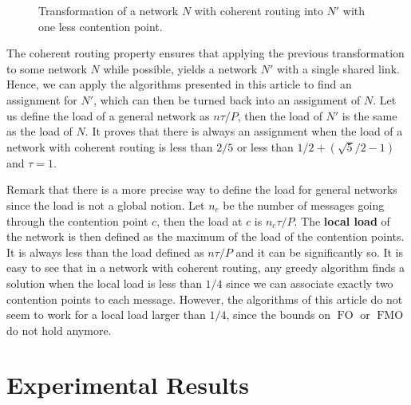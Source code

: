 \documentclass[a4paper,UKenglish,cleveref, autoref, thm-restate]{lipics-v2019}
\DeclareMathOperator{\Fo}{FO}
\DeclareMathOperator{\Fmo}{FMO}
\begin{document}
\begin{figure}
\begin{center}
\begin{minipage}[c]{.45\linewidth}
{
}



\end{minipage}
 \caption{Transformation of a network $N$ with coherent routing into $N'$ with one less contention point.}

\label{fig:transformation}
\end{center}
\end{figure}


The coherent routing property ensures that applying the previous transformation to some network $N$ while possible, yields a network $N'$ with a single shared link. Hence, we can apply the algorithms presented in this article to find an assignment for $N'$, which can then be turned back into an assignment of $N$. Let us define the load of a general network as $n\tau /P$, then the load of $N'$ is the same as the load of $N$. It proves that there is always an assignment when the load of a network with coherent routing is less than $2/5$ or less than $1/2 + (\sqrt{5}/2 -1)$ and $\tau = 1$. 

Remark that there is a more precise way to define the load for general networks since the load is not a global notion. 
Let $n_c$ be the number of messages going through the contention point $c$, then the load at $c$ is $n_c\tau/P$. The \textbf{local load} of the network is then defined as the maximum
of the load of the contention points. It is always less than the load defined as $n\tau /P$ and it can be significantly so.
It is easy to see that in a network with coherent routing, any greedy algorithm finds a solution when the local load is less than $1/4$ since we can associate 
exactly two contention points to each message. However, the algorithms of this article do not seem to work for a local load larger than $1/4$, since the bounds on $\Fo$ or $\Fmo$ do not hold anymore. 




\section{Experimental Results}
\end{document}
